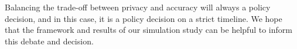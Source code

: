 \documentclass{article}
\begin{document}
Balancing the trade-off between privacy and accuracy will always a policy decision, and in this case, it 
is a policy decision on a strict timeline.  We hope that the framework and results of our simulation study can be helpful to inform this debate and decision.





\end{document}

